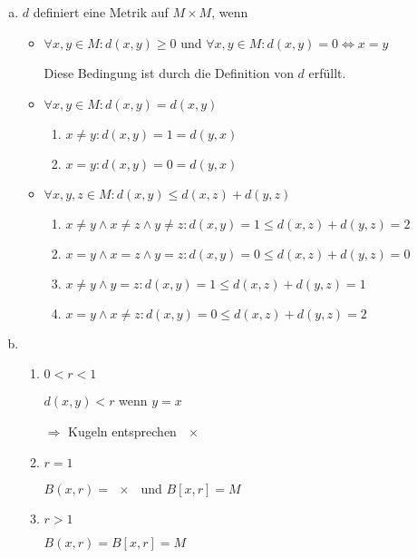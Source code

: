 \documentclass{scrreprt}
\begin{document}
\begin{enumerate}[a)]
\item $d$ definiert eine Metrik auf $M \times M$, wenn
  \begin{itemize}
  \item $\forall x, y \in M \colon d(x,y) \geq 0$ und
    $\forall x,y \in M \colon d(x,y) = 0 \iff x = y$

    Diese Bedingung ist durch die Definition von $d$ erfüllt.

  \item $\forall x,y \in M \colon d(x, y) = d(x, y)$
    \begin{enumerate}[label={Fall \arabic*:},leftmargin=*]
    \item $x \ne y \colon d(x, y) = 1 = d(y, x)$
    \item $x = y \colon d(x, y) = 0 = d(y, x)$
    \end{enumerate}

  \item $\forall x,y,z \in M \colon d(x,y) \leq d(x,z) + d(y,z)$
    \begin{enumerate}[label={Fall \arabic*:},leftmargin=*]
    \item $x \ne y \land x \ne z \land y \ne z \colon d(x, y) = 1 \leq d(x, z) + d(y, z) = 2$
    \item $x = y \land x = z \land y = z \colon d(x, y) = 0 \leq d(x, z) + d(y, z) = 0$
    \item $x \ne y \land y = z \colon d(x, y) = 1 \leq d(x, z) + d(y, z) = 1$
    \item $x = y \land x \ne z \colon d(x, y) = 0 \leq d(x, z) + d(y, z) = 2$
    \end{enumerate}

  \end{itemize}

\item
  \begin{enumerate}[label={Fall \arabic*:},leftmargin=*]
  \item $0 < r < 1$

    $d(x, y) < r$ wenn $y = x$

    $\Rightarrow$ Kugeln entsprechen $\qty{x}$
  \item $r = 1$

    $B(x, r) = \qty{x}$ und $B[x,r] = M$
  \item $r > 1$

    $B(x, r) = B[x, r] = M$
  \end{enumerate}
\end{enumerate}
\end{document}
